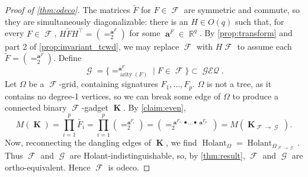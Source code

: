 \documentclass{article}
\theoremstyle{remark}
\theoremstyle{definition}
\DeclareMathOperator{\rr}{\mathbb{R}}
\DeclareMathOperator{\arity}{arity}
\DeclareMathOperator{\vk}{\mathbf{K}}
\DeclareMathOperator{\va}{\mathbf{a}}
\DeclareMathOperator{\fc}{\mathcal{F}}
\DeclareMathOperator{\gc}{\mathcal{G}}
\DeclareMathOperator{\holant}{Holant}
\DeclareMathOperator{\geneq}{\mathcal{GEQ}}
\begin{document}
\begin{proof}[Proof of \autoref{thm:odeco}]
    The matrices $\widetilde{F}$ for $F \in \fc$ are symmetric and commute, so they are simultaneously diagonalizable:
    there is an $H \in O(q)$ such that, for every $F \in \fc$, $H\widetilde{F}H^\top = (=_2^{\va^F})$ 
    for some $\va^F \in \rr^{q}$.
    By \autoref{prop:transform} and part 2 of \autoref{prop:invariant_tcwd},
    we may replace $\fc$ with $H\fc$ to assume each $\widetilde{F} = (=_2^{\va^F})$. Define
    \[
       \gc = \{=_{\arity(F)}^{\va^F} \mid F \in \fc\} \subset \geneq.
    \]
    Let $\Omega$ be a $\fc$-grid,
    containing signatures $F_1,\ldots,F_p$.
    $\Omega$ is not a tree, as it contains no degree-1 vertices, so we can break some edge of $\Omega$
    to produce a connected binary $\fc$-gadget $\vk$. By \autoref{claim:even},
    \[
        M(\vk) = \prod_{i=1}^{p} \widetilde{F_i} = \prod_{i=1}^{p}(=_2^{\va^{F_i}})
        = \left(=_2^{\va^{F_1} \bullet \ldots \bullet \va^{F_p}}\right) = M(\vk_{\fc\to\gc}).
    \]
    Now, reconnecting the dangling edges of $\vk$, we find $\holant_{\Omega} = 
    \holant_{\Omega_{\fc\to\gc}}$. Thus $\fc$ and $\gc$ are Holant-indistinguishable, so, by
    \autoref{thm:result}, $\fc$ and $\gc$ are ortho-equivalent. Hence $\fc$ is odeco.


\end{proof}
\end{document}
